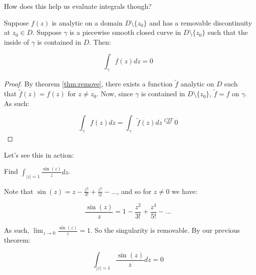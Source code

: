 How does this help us evaluate integrals though?

\begin{thmbo}{}{} Suppose $f(z)$ is analytic on a domain $D\setminus\{z_0\}$ and has a removable discontinuity at $z_0\in D$. Suppose $\gamma$ is a piecewise smooth closed curve in $D\setminus\{z_0\}$ such that the inside of $\gamma$ is contained in $D$. Then:

$$\int_{\gamma} f(z)dz = 0$$
\end{thmbo}

\begin{proof} By theorem \ref{thm:remove}, there exists a function $\tilde{f}$ analytic on $D$ such that $\tilde{f}(z) = f(z)$ for $z\ne z_0$. Now, since $\gamma$ is contained in $D\setminus\{z_0\}$, $\tilde{f} = f$ on $\gamma$. As such:

$$\int_{\gamma} f(z)dz = \int_{\gamma} \tilde{f}(z)dz \stackrel{CIT}{=} 0$$
\end{proof}


Let's see this in action:

\begin{ex}{}{} Find $\int_{|z| = 1} \frac{\sin(z)}{z}dz$.

Note that $\sin(z) = z - \frac{z^3}{3!} + \frac{z^5}{5!} - ...$, and so for $z\ne 0$ we have:

$$\frac{\sin(z)}{z} = 1 - \frac{z^2}{3!} + \frac{z^4}{5!} - ...$$

As such, $\lim_{z\rightarrow 0} \frac{\sin(z)}{z} = 1$. So the singularity is removable. By our previous theorem:

$$\int_{|z| = 1} \frac{\sin(z)}{z}dz = 0$$
\end{ex}

